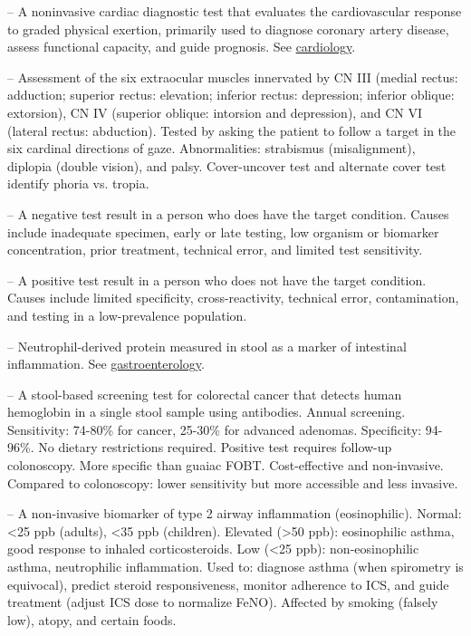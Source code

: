 -- A noninvasive cardiac diagnostic test that evaluates the cardiovascular response to graded physical exertion, primarily used to diagnose coronary artery disease, assess functional capacity, and guide prognosis. See \hyperlink{Cardiology}{cardiology}.

-- Assessment of the six extraocular muscles innervated by CN III (medial rectus: adduction; superior rectus: elevation; inferior rectus: depression; inferior oblique: extorsion), CN IV (superior oblique: intorsion and depression), and CN VI (lateral rectus: abduction). Tested by asking the patient to follow a target in the six cardinal directions of gaze. Abnormalities: strabismus (misalignment), diplopia (double vision), and palsy. Cover-uncover test and alternate cover test identify phoria vs. tropia.

-- A negative test result in a person who does have the target condition. Causes include inadequate specimen, early or late testing, low organism or biomarker concentration, prior treatment, technical error, and limited test sensitivity.

-- A positive test result in a person who does not have the target condition. Causes include limited specificity, cross-reactivity, technical error, contamination, and testing in a low-prevalence population.

-- Neutrophil-derived protein measured in stool as a marker of intestinal inflammation. See \hyperlink{Gastroenterology}{gastroenterology}.

-- A stool-based screening test for colorectal cancer that detects human hemoglobin in a single stool sample using antibodies. Annual screening. Sensitivity: 74-80\% for cancer, 25-30\% for advanced adenomas. Specificity: 94-96\%. No dietary restrictions required. Positive test requires follow-up colonoscopy. More specific than guaiac FOBT. Cost-effective and non-invasive. Compared to colonoscopy: lower sensitivity but more accessible and less invasive.

-- A non-invasive biomarker of type 2 airway inflammation (eosinophilic). Normal: <25 ppb (adults), <35 ppb (children). Elevated (>50 ppb): eosinophilic asthma, good response to inhaled corticosteroids. Low (<25 ppb): non-eosinophilic asthma, neutrophilic inflammation. Used to: diagnose asthma (when spirometry is equivocal), predict steroid responsiveness, monitor adherence to ICS, and guide treatment (adjust ICS dose to normalize FeNO). Affected by smoking (falsely low), atopy, and certain foods.

